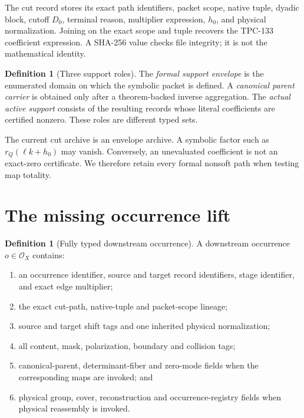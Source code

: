 \documentclass[11pt]{article}
\theoremstyle{definition}
\newtheorem{definition}[theorem]{Definition}
\theoremstyle{remark}
\newcommand{\Occ}{\mathcal O_X}
\begin{document}
The cut record stores its exact path identifiers, packet scope,
native tuple, dyadic block, cutoff \(D_0\), terminal reason,
multiplier expression, \(h_0\), and physical normalization.
Joining on the exact scope and tuple recovers the TPC-133 coefficient
expression.  A SHA-256 value checks file integrity; it is not the
mathematical identity.

\begin{definition}[Three support roles]
The \emph{formal support envelope} is the enumerated domain on which
the symbolic packet is defined.  A \emph{canonical parent carrier}
is obtained only after a theorem-backed inverse aggregation.  The
\emph{actual active support} consists of the resulting records whose
literal coefficients are certified nonzero.  These roles are
different typed sets.
\end{definition}

The current cut archive is an envelope archive.  A symbolic factor
such as \(r_Q(\ell k+h_0)\) may vanish.  Conversely, an unevaluated
coefficient is not an exact-zero certificate.  We therefore retain
every formal nonsoft path when testing map totality.

\section{The missing occurrence lift}

\begin{definition}[Fully typed downstream occurrence]
A downstream occurrence \(o\in\Occ\) contains:
\begin{enumerate}[label=(\roman*),leftmargin=2.2em]
\item an occurrence identifier, source and target record
identifiers, stage identifier, and exact edge multiplier;
\item the exact cut-path, native-tuple and packet-scope lineage;
\item source and target shift tags and one inherited physical
normalization;
\item all content, mask, polarization, boundary and collision tags;
\item canonical-parent, determinant-fiber and zero-mode fields when
the corresponding maps are invoked; and
\item physical group, cover, reconstruction and occurrence-registry
fields when physical reassembly is invoked.
\end{enumerate}
\end{definition}
\end{document}
